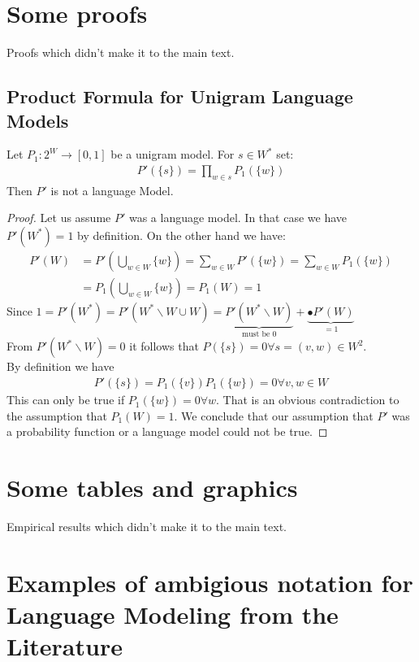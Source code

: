 \documentclass[•]{book}
\begin{document}
\begin{appendix}
\chapter{Some proofs}\label{a:proofs}
Proofs which didn't make it to the main text.
\section*{Product Formula for Unigram Language Models}
\begin{theorem}
Let $P_1:2^W\longrightarrow[0,1]$ be a unigram model. For $s\in W^{*}$ set:
\begin{align}
P'(\{s\})= \prod_{w\in s}P_1(\{w\})
\end{align} 
Then $P'$ is not a language Model.
\end{theorem}
\begin{proof}
Let us assume $P'$ was a language model. In that case we have  $P'(W^{*}) =1$ by definition. On the other hand we have:
\begin{align}
P'(W) & = P'(\bigcup_{w\in W}\{w\})= \sum_{w\in W}P'(\{w\}) = \sum_{w\in W}P_1(\{w\}) \\
 & = P_1(\bigcup_{w\in W}\{w\})= P_1(W) = 1
\end{align}
Since $1 = P'(W^{*}) = P'(W^{*}\backslash W \cup W)= \underbrace{ P'(W^{*}\backslash W)}_{\text{must be }0} + \underbrace{•P'(W)}_{=1}$  \\
From $P'(W^{*}\backslash W)=0$ it follows that $P(\{s\}) = 0 \forall s=(v,w)\in W^2$.\\
By definition we have 
\begin{align}
P'(\{s\})=P_1(\{v\})P_1(\{w\})  = 0 \forall v,w \in W
\end{align}
This can only be true if $P_1(\{w\}) = 0 \forall w$. That is an obvious contradiction to the assumption that $P_1(W)=1$. We conclude that our assumption that $P'$ was a probability function or a language model could not be true.
\end{proof}

\chapter{Some tables and graphics}
Empirical results which didn't make it to the main text.

\chapter{Examples of ambigious notation for Language Modeling from the Literature}\label{a:ambigiousNotation}

\end{appendix}

\glsaddall
\printnoidxglossaries



\end{document}

